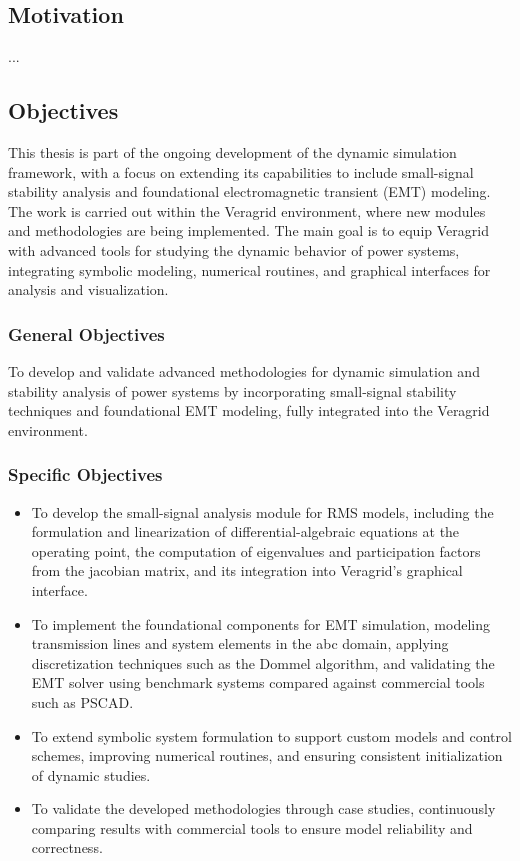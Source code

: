 \subsection{Motivation}

...

\subsection{Objectives}

This thesis is part of the ongoing development of the dynamic simulation framework, 
with a focus on extending its capabilities to include small-signal stability analysis and foundational electromagnetic transient (EMT) modeling. 
The work is carried out within the Veragrid environment, where new modules and methodologies are being implemented. 
The main goal is to equip Veragrid with advanced tools for studying the dynamic behavior of power systems, integrating symbolic modeling, numerical routines,
and graphical interfaces for analysis and visualization.

\subsubsection*{General Objectives}

To develop and validate advanced methodologies for dynamic simulation and stability analysis of power systems by incorporating small-signal stability techniques and foundational EMT modeling, fully integrated into the Veragrid environment.

\subsubsection*{Specific Objectives}

\begin{itemize}
    \item To develop the small-signal analysis module for RMS models, including the formulation and linearization of differential-algebraic equations at the operating point,
     the computation of eigenvalues and participation factors from the jacobian matrix, and its integration into Veragrid's graphical interface.
    \item To implement the foundational components for EMT simulation, modeling transmission lines and system elements in the abc domain, applying discretization techniques
     such as the Dommel algorithm, and validating the EMT solver using benchmark systems compared against commercial tools such as PSCAD.
    \item To extend symbolic system formulation to support custom models and control schemes, improving numerical routines, and ensuring consistent initialization of dynamic studies.
    \item To validate the developed methodologies through case studies, continuously comparing results with commercial tools to ensure model reliability and correctness.
\end{itemize}




